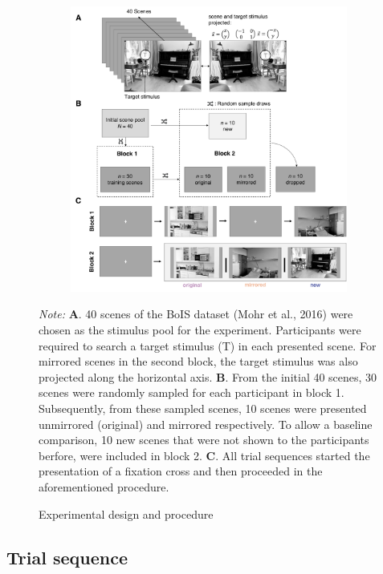 \documentclass[
  man,floatsintext]{apa7}
\begin{document}
\begin{figure}[H]

\begin{figure}

{\centering \includegraphics[width=0.8\linewidth]{../results/figures/experimental_design} 

}

\end{figure}

\caption{Experimental design and procedure\label{fig:experimental-design}}
\begingroup
\footnotesize
\textit{Note:} \textbf{A}. 40 scenes of the BoIS dataset (Mohr et al., 2016) were chosen as the stimulus pool for the experiment. Participants were required to search a target stimulus (T) in each presented scene. For mirrored scenes in the second block, the target stimulus was also projected along the horizontal axis.  \textbf{B}. From the initial 40 scenes, 30 scenes were randomly sampled for each participant in block 1. Subsequently, from these sampled scenes,  10 scenes were presented unmirrored (original) and mirrored respectively. To allow a baseline comparison, 10 new scenes that were not shown to the participants berfore, were included in block 2. \textbf{C}. All trial sequences started the presentation of a fixation cross and then proceeded in the aforementioned procedure. 
\endgroup
\end{figure}

\hypertarget{trial-sequence}{%
\subsection{Trial sequence}\label{trial-sequence}}
\end{document}
